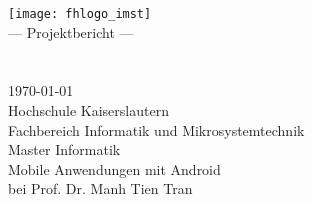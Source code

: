 \begin{titlepage}
	\begin{center}
    	\texttt{[image: fhlogo\_imst]}\\
    	\vspace{5em}
		\rmfamily\Large 
    	 --- Projektbericht ---\\
		\vspace{2\baselineskip}
		\rmfamily\huge 
	    \textbf{\mysubtitle}\\
		\vspace{3\baselineskip}
		\rmfamily\Large 
		\myauthor\\
		\vspace{2\baselineskip}
		\rmfamily\Large
		\today \\
		\vspace{1\baselineskip}
		\rmfamily\Large
		Hochschule Kaiserslautern\\
		Fachbereich Informatik und Mikrosystemtechnik\\
		Master Informatik\\
		\vspace{2\baselineskip}
		Mobile Anwendungen mit Android\\
		bei Prof. Dr. Manh Tien Tran 
	\end{center}
\end{titlepage}

